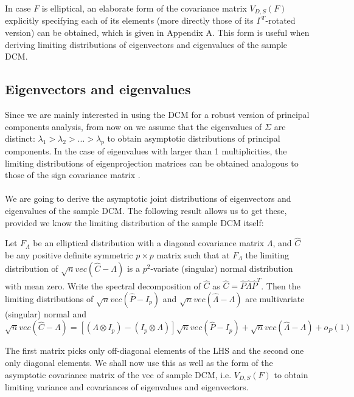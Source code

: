 \documentclass[fleqn,11pt]{article}
\begin{document}
In case $F$ is elliptical, an elaborate form of the covariance matrix $V_{D,S}(F)$ explicitly specifying each of its elements (more directly those of its $\Gamma^T$-rotated version) can be obtained, which is given in Appendix A. This form is useful when deriving limiting distributions of eigenvectors and eigenvalues of the sample DCM.

\subsection{Eigenvectors and eigenvalues} Since we are mainly interested in using the DCM for a robust version of principal components analysis, from now on we assume that the eigenvalues of $\Sigma$ are distinct: $\lambda_1 > \lambda_2 > ... > \lambda_p$ to obtain asymptotic distributions of principal components. In the case of eigenvalues with larger than 1 multiplicities, the limiting distributions of eigenprojection matrices can be obtained analogous to those of the sign covariance matrix \citep{magyar14}.

\paragraph{}We are going to derive the asymptotic joint distributions of eigenvectors and eigenvalues of the sample DCM. The following result allows us to get these, provided we know the limiting distribution of the sample DCM itself:

\begin{Theorem} \label{Theorem:decomp} \citep{taskinen12}
Let $F_\Lambda$ be an elliptical distribution with a diagonal covariance matrix $\Lambda$, and $\hat C$ be any positive definite symmetric $p \times p$ matrix such that at $F_\Lambda$ the limiting distribution of $\sqrt n vec(\hat C - \Lambda)$ is a $p^2$-variate (singular) normal distribution with mean zero. Write the spectral decomposition of $\hat C$ as $\hat C = \hat P \hat\Lambda \hat P^T$. Then the limiting distributions of $\sqrt n vec(\hat P - I_p)$ and $\sqrt n vec(\hat\Lambda - \Lambda)$ are multivariate (singular) normal and
\begin{equation} \label{equation:decompEq}
\sqrt n vec (\hat C - \Lambda)  = \left[ (\Lambda \otimes I_p) - (I_p \otimes \Lambda) \right] \sqrt n vec (\hat P - I_p) + \sqrt n vec (\hat\Lambda - \Lambda) + o_P(1)
\end{equation}
\end{Theorem}

The first matrix picks only off-diagonal elements of the LHS and the second one only diagonal elements. We shall now use this as well as the form of the asymptotic covariance matrix of the vec of sample DCM, i.e. $V_{D,S}(F)$ to obtain limiting variance and covariances of eigenvalues and eigenvectors.
\end{document}
